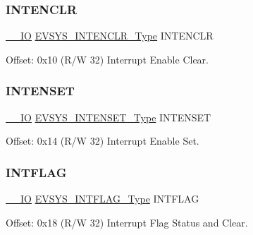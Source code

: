 \mbox{\label{struct_evsys_af275bc7b2d0cf200c814dde1520d6b98}} 
\subsubsection{\texorpdfstring{INTENCLR}{INTENCLR}}
{\footnotesize\ttfamily \mbox{\hyperlink{core__cm0plus_8h_aec43007d9998a0a0e01faede4133d6be}{\+\_\+\+\_\+\+IO}} \mbox{\hyperlink{union_e_v_s_y_s___i_n_t_e_n_c_l_r___type}{E\+V\+S\+Y\+S\+\_\+\+I\+N\+T\+E\+N\+C\+L\+R\+\_\+\+Type}} I\+N\+T\+E\+N\+C\+LR}



Offset\+: 0x10 (R/W 32) Interrupt Enable Clear. 

\mbox{\label{struct_evsys_a13685bdf4d3dcde4c0edcc12c91efed3}} 
\subsubsection{\texorpdfstring{INTENSET}{INTENSET}}
{\footnotesize\ttfamily \mbox{\hyperlink{core__cm0plus_8h_aec43007d9998a0a0e01faede4133d6be}{\+\_\+\+\_\+\+IO}} \mbox{\hyperlink{union_e_v_s_y_s___i_n_t_e_n_s_e_t___type}{E\+V\+S\+Y\+S\+\_\+\+I\+N\+T\+E\+N\+S\+E\+T\+\_\+\+Type}} I\+N\+T\+E\+N\+S\+ET}



Offset\+: 0x14 (R/W 32) Interrupt Enable Set. 

\mbox{\label{struct_evsys_af31a4852e80ca7c663830992615c584e}} 
\subsubsection{\texorpdfstring{INTFLAG}{INTFLAG}}
{\footnotesize\ttfamily \mbox{\hyperlink{core__cm0plus_8h_aec43007d9998a0a0e01faede4133d6be}{\+\_\+\+\_\+\+IO}} \mbox{\hyperlink{union_e_v_s_y_s___i_n_t_f_l_a_g___type}{E\+V\+S\+Y\+S\+\_\+\+I\+N\+T\+F\+L\+A\+G\+\_\+\+Type}} I\+N\+T\+F\+L\+AG}



Offset\+: 0x18 (R/W 32) Interrupt Flag Status and Clear. 

\mbox{\label{struct_evsys_a0ec4ccebd5bfbf4f17510e15a5a9ff81}} 
